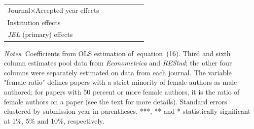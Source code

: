 \begin{table}
\begin{threeparttable}
\begin{tabular}{p{3.78cm}S@{}S@{}S@{}S@{}S@{}S@{}}
            Journal\(\times\)Accepted year effects &               &               &           {}   &               &               &           {}   \\
            Institution effects           &           {}   &           {}   &           {}   &           {}   &           {}   &           {}   \\
            \textit{JEL} (primary) effects&               &               &               &           {}   &           {}   &           {}   \\
            \bottomrule
        \end{tabular}
        \begin{tablenotes}
            \tiny
            \item \textit{Notes}. Coefficients from OLS estimation of~equation~(16). Third and sixth column estimates pool data from \textit{Econometrica} and \textit{REStud}; the other four columns were separately estimated on data from each journal. The variable "female ratio" defines papers with a strict minority of female authors as male-authored; for papers with 50 percent or more female authors, it is the ratio of female authors on a paper (see the text for more details). Standard errors clustered by submission year in parentheses. ***, ** and * statistically significant at 1\%, 5\% and 10\%, respectively.
        \end{tablenotes}
    \end{threeparttable}
\end{table}